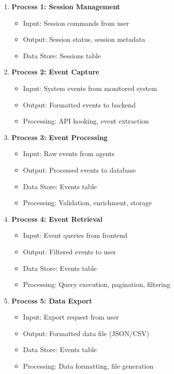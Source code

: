 \begin{enumerate}
    \item \textbf{Process 1: Session Management}
    \begin{itemize}
        \item Input: Session commands from user
        \item Output: Session status, session metadata
        \item Data Store: Sessions table
    \end{itemize}
    
    \item \textbf{Process 2: Event Capture}
    \begin{itemize}
        \item Input: System events from monitored system
        \item Output: Formatted events to backend
        \item Processing: API hooking, event extraction
    \end{itemize}
    
    \item \textbf{Process 3: Event Processing}
    \begin{itemize}
        \item Input: Raw events from agents
        \item Output: Processed events to database
        \item Data Store: Events table
        \item Processing: Validation, enrichment, storage
    \end{itemize}
    
    \item \textbf{Process 4: Event Retrieval}
    \begin{itemize}
        \item Input: Event queries from frontend
        \item Output: Filtered events to user
        \item Data Store: Events table
        \item Processing: Query execution, pagination, filtering
    \end{itemize}
    
    \item \textbf{Process 5: Data Export}
    \begin{itemize}
        \item Input: Export request from user
        \item Output: Formatted data file (JSON/CSV)
        \item Data Store: Events table
        \item Processing: Data formatting, file generation
    \end{itemize}
\end{enumerate}


